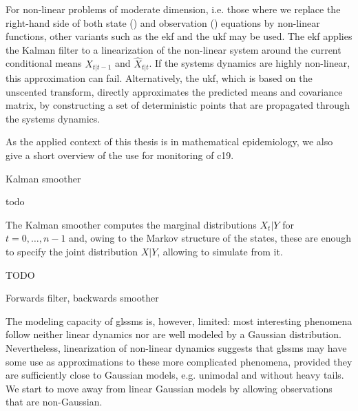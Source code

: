 For non-linear problems of moderate dimension, i.e. those where we replace the right-hand side of both state () and observation () equations by non-linear functions, other variants such as the \acrfull{ekf}  and the \acrfull{ukf}  may be used. The \acrshort{ekf} applies the Kalman filter to a linearization of the non-linear system around the current conditional means $\hat X_{t| t-1}$ and $\hat X_{t|t}$. If the systems dynamics are highly non-linear, this approximation can fail. Alternatively, the \acrshort{ukf}, which is based on the unscented transform, directly approximates the predicted means and covariance matrix, by constructing a set of deterministic points that are propagated through the systems dynamics. 

As the applied context of this thesis is in mathematical epidemiology, we also give a short overview of the use  for monitoring of \acrshort{c19}. 

\begin{algorithm}
    \caption{Kalman smoother}
    \label{alg:kalman_smoother}
    \begin{algorithmic}
        \Require todo
    \end{algorithmic}
\end{algorithm}

The Kalman smoother computes the marginal distributions $X_{t} | Y$ for $t = 0, \dots, n-1$ and, owing to the Markov structure of the states, these are enough to specify the joint distribution $X|Y$, allowing to simulate from it.

\begin{algorithm}
    \begin{algorithmic}
        \Require TODO
    \end{algorithmic}
    \caption{Forwards filter, backwards smoother \citep[Proposition 1]{Fruhwirth-Schnatter1994Data}} \label{alg:ffbs}
\end{algorithm}

The modeling capacity of \glspl{glssm} is, however, limited: most interesting phenomena follow neither linear dynamics nor are well modeled by a Gaussian distribution.
Nevertheless, linearization of non-linear dynamics suggests that  \gls{glssm}s may have some use as approximations to these more complicated phenomena, provided they are sufficiently close to Gaussian models, e.g. unimodal and without heavy tails.
We start to move away from linear Gaussian models by allowing observations that are non-Gaussian.
